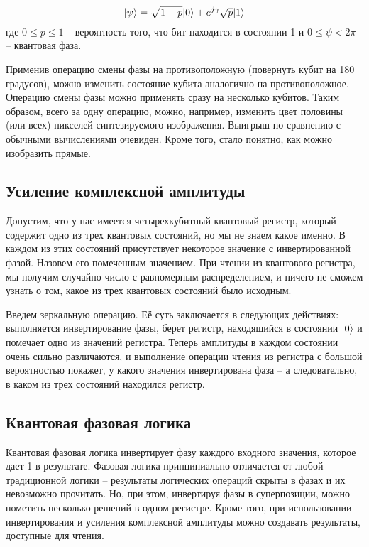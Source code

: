\begin{equation} 
\label{for:new_ver}
\lvert\psi\rangle = \sqrt{1 - p}\lvert0\rangle + e^{j\gamma}\sqrt{p}\lvert1\rangle
\end{equation} где $0 \leq p \leq 1$ -- вероятность того, что бит находится в состоянии 1 и $0 \leq \psi < 2\pi$ -- квантовая фаза.

Применив операцию смены фазы на противоположную (повернуть кубит на 180 градусов), можно изменить состояние кубита аналогично на противоположное. Операцию смены фазы можно применять сразу на несколько кубитов. Таким образом, всего за одну операцию, можно, например, изменить цвет половины (или всех) пикселей синтезируемого изображения. Выигрыш по сравнению с обычными вычислениями очевиден. Кроме того, стало понятно, как можно изобразить прямые. 

\subsection{Усиление комплексной амплитуды}

Допустим, что у нас имеется четырехкубитный квантовый регистр, который содержит одно из трех квантовых состояний, но мы не знаем какое именно. В каждом из этих состояний присутствует некоторое значение с инвертированной фазой. Назовем его помеченным значением. При чтении из квантового регистра, мы получим случайно число с равномерным распределением, и ничего не сможем узнать о том, какое из трех квантовых состояний было исходным.

Введем зеркальную операцию. Её суть заключается в следующих действиях: выполняется инвертирование фазы, берет регистр, находящийся в состоянии $\lvert0\rangle$ и помечает одно из значений регистра. Теперь амплитуды в каждом состоянии очень сильно различаются, и выполнение операции чтения из регистра с большой вероятностью покажет, у какого значения инвертирована фаза -- а следовательно, в каком из трех состояний находился регистр.

\subsection{Квантовая фазовая логика}

Квантовая фазовая логика инвертирует фазу каждого входного значения, которое дает 1 в результате.
Фазовая логика принципиально отличается от любой традиционной логики -- результаты логических операций скрыты в фазах и их невозможно прочитать. Но, при этом, инвертируя фазы в суперпозиции, можно пометить несколько решений в одном регистре. Кроме того, при использовании инвертирования и усиления комплексной амплитуды можно создавать результаты, доступные для чтения.

